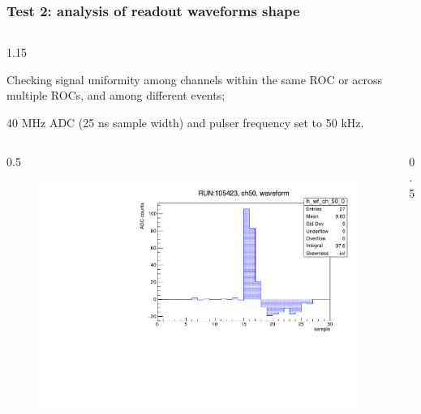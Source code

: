 \documentclass{beamer}
\begin{document}
\begin{frame}
    \frametitle{Test 2: analysis of readout waveforms shape}
    \vspace{-4mm}
    \begin{columns}
\begin{column}{1.15\framewidth}
    \setlength{\leftmargini}{1.2em}
 \begin{itemize}
 {\footnotesize
  \item Checking signal uniformity among channels within the same ROC or across multiple ROCs, and among different events;
  \item 40 MHz ADC (25 ns sample width) and pulser frequency set to 50 kHz.}
  \end{itemize}
    \end{column}
    \end{columns}
    \vspace{0mm}
    \begin{columns}
\begin{column}{0.5\framewidth}
         \begin{figure}[!h]
      \centering
      \hspace*{-2em}
      \includegraphics[width=1.\columnwidth]{figures/pdf/wf_ch50_0.pdf}
     \label{fig:normalhits}
\end{figure}
\end{column}
\begin{column}{0.5\framewidth}

\end{column}
\end{columns}
\end{frame}
\end{document}
